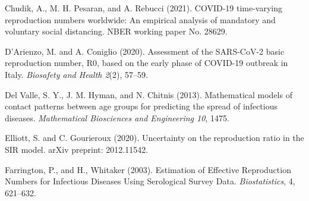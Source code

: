 \documentclass[12pt]{article}
\begin{document}
\begin{singlespace}
\begin{footnotesize}%
\vspace{-0.3cm}%
%

\begin{list}{}{\setlength{\topsep}{8pt}\setlength{\leftmargin}{0.1in}%
\setlength{\listparindent}{-0.1in}\setlength{\itemindent}{-0.1in}%
\setlength{\parsep}{0.6em}}%
%

\item
Chudik, A., M. H. Pesaran, and A. Rebucci (2021). COVID-19 time-varying
reproduction numbers worldwide: An empirical analysis of mandatory and
voluntary social distancing. NBER working paper No. 28629.%

\item
D'Arienzo, M. and A. Coniglio (2020). Assessment of the SARS-CoV-2 basic
reproduction number, R0, based on the early phase of COVID-19 outbreak in
Italy. \textit{Biosafety and Health 2}(2), 57--59.%

\item
Del Valle, S. Y., J. M. Hyman, and N. Chitnis (2013). Mathematical models of
contact patterns between age groups for predicting the spread of infectious
diseases. \textit{Mathematical Biosciences and Engineering 10}, 1475.%

\item
Elliott, S. and C. Gourieroux (2020). Uncertainty on the reproduction ratio in
the SIR model. arXiv preprint: 2012.11542.%

\item
Farrington, P., and H., Whitaker (2003). Estimation of Effective Reproduction
Numbers for Infectious Diseases Using Serological Survey Data.
\textit{Biostatistics}, 4, 621--632.%


\end{list}
\end{footnotesize}
\end{singlespace}
\end{document}
